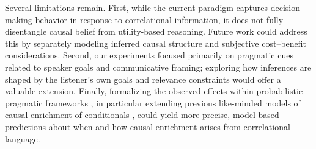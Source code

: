 \documentclass[10pt,letterpaper]{article}
\begin{document}



Several limitations remain. First, while the current paradigm captures decision-making behavior in response to correlational information, it does not fully disentangle causal belief from utility-based reasoning. Future work could address this by separately modeling inferred causal structure and subjective cost–benefit considerations. Second, our experiments focused primarily on pragmatic cues related to speaker goals and communicative framing; exploring how inferences are shaped by the listener’s own goals and relevance constraints would offer a valuable extension. Finally, formalizing the observed effects within probabilistic pragmatic frameworks \citep{goodman2016pragmatic,ScontrasTessler2021:A-practical-int,Degen2023:The-Rational-Sp}, in particular extending previous like-minded models of causal enrichment of conditionals \citep{grusdt_probabilistic_2022}, could yield more precise, model-based predictions about when and how causal enrichment arises from correlational language.
\end{document}
